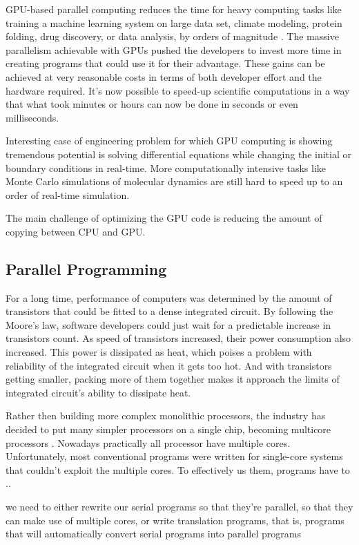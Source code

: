 GPU-based parallel computing reduces the time for heavy computing tasks like training a machine learning system on large data set, climate modeling, protein folding, drug discovery, or data analysis, by orders of magnitude \citep{stortiCUDAEngineersIntroduction2016, PACHECO20111}. The massive parallelism achievable with GPUs pushed the developers to invest more time in creating programs that could use it for their advantage. These gains can be achieved at very reasonable costs in terms of both developer effort and the hardware required. It's now possible to speed-up scientific computations in a way that what took minutes or hours can now be done in seconds or even milliseconds.

Interesting case of engineering problem for which GPU computing is showing tremendous potential is solving differential equations while changing the initial or boundary conditions in real-time. More computationally intensive tasks like Monte Carlo simulations of molecular dynamics are still hard to speed up to an order of real-time simulation.

The main challenge of optimizing the GPU code is reducing the amount of copying between CPU and GPU.

\subsection{Parallel Programming}

For a long time, performance of computers was determined by the amount of transistors that could be fitted to a dense integrated circuit. By following the Moore's law, software developers could just wait for a predictable increase in transistors count. As speed of transistors increased, their power consumption also increased. This power is dissipated as heat, which poises a problem with reliability of the integrated circuit when it gets too hot. And with transistors getting smaller, packing more of them together makes it approach the limits of integrated circuit's ability to dissipate heat.

Rather then building more complex monolithic processors, the industry has decided to put many simpler processors on a single chip, becoming multicore processors \citep{PACHECO20111}. Nowadays practically all processor have multiple cores. Unfortunately, most conventional programs were written for single-core systems that couldn't exploit the multiple cores. To effectively us them, programs have to .. %

we need to either rewrite our serial programs so that they’re parallel, so that they can make use of multiple cores, or write translation programs, that is, programs that will automatically convert serial programs into parallel programs


